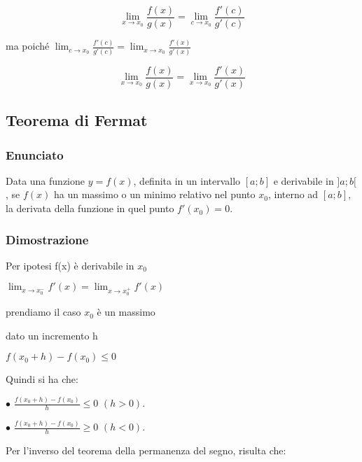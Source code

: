 \documentclass[a4paper,11pt]{article}
\begin{document}
\[
\lim_{x \to x_0} \frac{f(x)}{g(x)} =\lim_{c \to x_0} \frac{f'(c)}{g'(c)}      
\]

ma poiché $ \lim_{c \to x_0} \frac{f'(c)}{g'(c)} =  \lim_{x \to x_0} \frac{f'(x)}{g'(x)}  $

\[
    \lim_{x \to x_0} \frac{f(x)}{g(x)} =    \lim_{x \to x_0} \frac{f'(x)}{g'(x)}
\]







\subsection{Teorema di Fermat}




\subsubsection{Enunciato}

Data una funzione $y=f(x)$, definita in un intervallo $[a;b]$ e derivabile in $]a;b[$, se $f(x)$ ha un massimo o un minimo relativo nel punto $x_0$, interno ad $[a;b]$, la derivata della funzione in quel punto $f'(x_0)=0$. 

\vspace{1mm}
 
\subsubsection{Dimostrazione}

Per ipotesi f(x) è derivabile in $x_0$

$\lim_{x \to x_0^-} f'(x) = \lim_{x \to x_0^+} f'(x)$

prendiamo il caso $x_0$ è un massimo

dato un incremento h 

$f(x_0 + h) - f(x_0) \leq 0$

Quindi si ha che:

\vspace{1mm}

$\bullet$
$\frac{f(x_0 + h)-f(x_0)}{h} \leqslant 0$
\hspace{3mm}
$(h>0)$.

\vspace{1mm}

$\bullet$
$\frac{f(x_0 + h)-f(x_0)}{h} \geqslant 0$
\hspace{3mm}
$(h<0)$.

Per l'inverso del teorema della permanenza del segno, risulta che:
\end{document}
